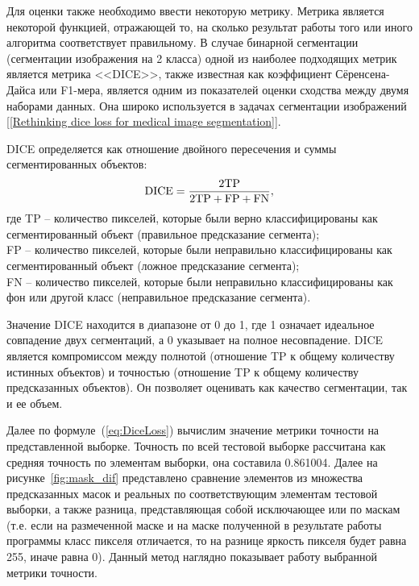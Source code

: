 \documentclass[14pt, a4paper]{extreport}
\begin{document}
	Для оценки также необходимо ввести некоторую метрику. Метрика является некоторой функцией, отражающей то, на сколько результат работы того или иного алгоритма соответствует правильному. В случае бинарной сегментации (сегментации изображения на 2 класса) одной из наиболее подходящих метрик является метрика <<DICE>>, также известная как коэффициент Сёренсена-Дайса или F1-мера, является одним из показателей оценки сходства между двумя наборами данных. Она широко используется в задачах сегментации изображений [\ref{Rethinking dice loss for medical image segmentation}].
	
	DICE определяется как отношение двойного пересечения и суммы сегментированных объектов:
	\begin{equation}
		\textup{DICE} = \frac{2\textup{TP}}{2\textup{TP} + \textup{FP} + \textup{FN}},
		\label{eq:DiceLoss}
	\end{equation}
	где TP -- количество пикселей, которые были верно классифицированы как сегментированный объект (правильное предсказание сегмента);\\
	\hspace*{0.8cm}FP -- количество пикселей, которые были неправильно классифицированы как сегментированный объект (ложное предсказание сегмента);\\
	\hspace*{0.8cm}FN -- количество пикселей, которые были неправильно классифицированы как фон или другой класс (неправильное предсказание сегмента).
	
	Значение DICE находится в диапазоне от 0 до 1, где 1 означает идеальное совпадение двух сегментаций, а 0 указывает на полное несовпадение. DICE является компромиссом между полнотой (отношение TP к общему количеству истинных объектов) и точностью (отношение TP к общему количеству предсказанных объектов). Он позволяет оценивать как качество сегментации, так и ее объем.
	
	Далее по формуле~(\ref{eq:DiceLoss}) вычислим значение метрики точности на представленной выборке. Точность по всей тестовой выборке рассчитана как средняя точность по элементам выборки, она составила 0.861004. Далее на рисунке~\ref{fig:mask_dif} представлено сравнение элементов из множества предсказанных масок и реальных по соответствующим элементам тестовой выборки, а также разница, представляющая собой исключающее или по маскам (т.е. если на размеченной маске и на маске полученной в результате работы программы класс пикселя отличается, то на разнице яркость пикселя будет равна 255, иначе равна 0). Данный метод наглядно показывает работу выбранной метрики точности.
	
\end{document}
